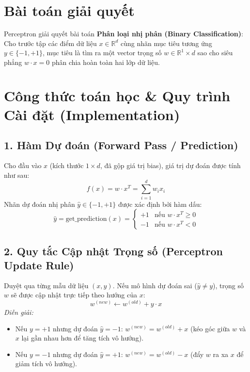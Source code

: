 \documentclass[11pt, a4paper]{article}
\begin{document}
\section{Bài toán giải quyết}
Perceptron giải quyết bài toán \textbf{Phân loại nhị phân (Binary Classification)}: Cho trước tập các điểm dữ liệu $x \in \mathbb{R}^d$ cùng nhãn mục tiêu tương ứng $y \in \{-1, +1\}$, mục tiêu là tìm ra một vector trọng số $w \in \mathbb{R}^1 \times d$ sao cho siêu phẳng $w \cdot x = 0$ phân chia hoàn toàn hai lớp dữ liệu.

\section{Công thức toán học \& Quy trình Cài đặt (Implementation)}

\subsection{1. Hàm Dự đoán (Forward Pass / Prediction)}
Cho đầu vào $x$ (kích thước $1 \times d$, đã gộp giá trị bias), giá trị dự đoán được tính như sau:
\begin{equation}
f(x) = w \cdot x^T = \sum_{i=1}^{d} w_i x_i
\end{equation}
Nhãn dự đoán nhị phân $\hat{y} \in \{-1, +1\}$ được xác định bởi hàm dấu:
\begin{equation}
\hat{y} = \text{get\_prediction}(x) = 
\begin{cases} 
+1 & \text{nếu } w \cdot x^T \ge 0 \\
-1 & \text{nếu } w \cdot x^T < 0 
\end{cases}
\end{equation}

\subsection{2. Quy tắc Cập nhật Trọng số (Perceptron Update Rule)}
Duyệt qua từng mẫu dữ liệu $(x, y)$. Nếu mô hình dự đoán sai ($\hat{y} \neq y$), trọng số $w$ sẽ được cập nhật trực tiếp theo hướng của $x$:
\begin{equation}
w^{(new)} \leftarrow w^{(old)} + y \cdot x
\end{equation}
\textit{Diễn giải:}
\begin{itemize}[itemsep=2pt]
    \item Nếu $y = +1$ nhưng dự đoán $\hat{y} = -1$: $w^{(new)} = w^{(old)} + x$ (kéo góc giữa $w$ và $x$ lại gần nhau hơn để tăng tích vô hướng).
    \item Nếu $y = -1$ nhưng dự đoán $\hat{y} = +1$: $w^{(new)} = w^{(old)} - x$ (đẩy $w$ ra xa $x$ để giảm tích vô hướng).
\end{itemize}
\end{document}

